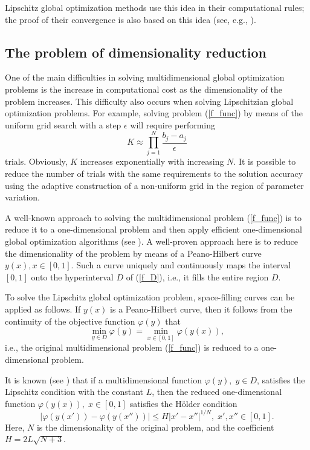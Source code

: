 \documentclass[preprint,12pt]{elsarticle}
\begin{document}
Lipschitz global optimization methods use this idea in their computational rules; the proof of their convergence is also based on this idea (see, e.g.,
\cite{Jones2021,PaulaviciusZilinskas2014,Sergeyev2013,Evtushenko2013}).

\subsection{The problem of dimensionality reduction} 

One of the main difficulties in solving multidimensional global optimization problems is the increase in computational cost as the dimensionality of the problem increases. This difficulty also occurs when solving Lipschitzian global optimization problems. 
For example, solving problem (\ref{f_func}) by means of the uniform grid search with a step $\epsilon$ will require performing
\[
K \approx \prod_{j=1}^N{\frac{b_j-a_j}{\epsilon}}
\]
trials. Obviously, $K$ increases exponentially with increasing $N$. It is possible to reduce the number of trials with the same requirements to the solution accuracy using the adaptive construction of a non-uniform grid in the region of parameter variation. 


A well-known approach to solving the multidimensional problem (\ref{f_func}) is to reduce it to a one-dimensional problem and then apply efficient one-dimensional global optimization algorithms (see \cite{Strongin2000,Sergeyev2013}). A well-proven approach here is to reduce the dimensionality of the problem by means of a Peano-Hilbert curve $y(x), x \in [0, 1]$.  Such a curve uniquely and continuously maps the interval $[0, 1]$ onto the hyperinterval $D$ of (\ref{f_D}), i.e., it fills the entire region $D$.


To solve the Lipschitz global optimization problem, space-filling curves can be applied as follows. If $y(x)$ is a Peano-Hilbert curve, then it follows from the continuity of the objective function $\varphi(y)$ that
\[
\min_{y \in D } \varphi(y) = \min_{x \in [0,1] } \varphi(y(x)),
\]
i.e., the original multidimensional problem (\ref{f_func}) is reduced to a one-dimensional problem.

It is known (see \cite{Strongin2000}) that if a multidimensional function  $\varphi(y), \; y \in D$,  satisfies the Lipschitz condition with the constant $L$, then the reduced one-dimensional function $\varphi(y(x)), \; x \in [0,1]$ satisfies the H{\"o}lder condition
\[
\left|\varphi(y(x'))-\varphi(y(x''))\right|\leq H\left|x'-x''\right|^{1/N}, \; x',x''\in[0,1].
\]
Here, $N$ is the dimensionality of the original problem, and the coefficient
$ H=2 L \sqrt{N+3}$.
\end{document}
